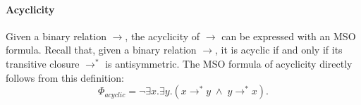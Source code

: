 
\paragraph*{Acyclicity} 

Given a binary relation $\to$, the acyclicity of $\to$ can be expressed with an MSO formula. Recall that, given a binary relation $\to$, it is acyclic if and only if its transitive closure $\to^*$ is antisymmetric. The MSO formula of acyclicity directly follows from this definition:
\[
\Phi_{acyclic} =  \neg \exists x.\exists y.(x \to^* y \;\wedge\; y \to^* x).   
\]